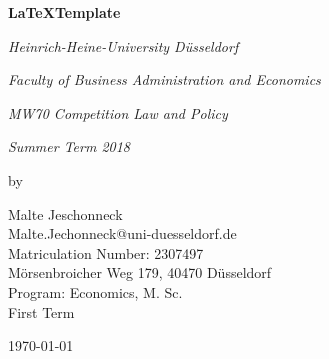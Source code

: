 \documentclass[a4paper]{scrartcl}
\begin{document}
	
	\def\sectionautorefname{section}
	\def\subsectionautorefname{section}
	\def\subsubsectionautorefname{section}
	\def\equationautorefname{equation}
	\def\algorithmautorefname{Algorithm}
	
	
	\thispagestyle{empty}
	
	\begin{titlepage}
		\centering
		\vspace{1cm}
		{\Large\bfseries \LaTeX Template \par}
		\vspace{4cm}
		{\large\itshape Heinrich-Heine-University Düsseldorf\par}
		\vspace{0.5cm}
		{\large\itshape Faculty of Business Administration and Economics\par}
		\vspace{0.5cm}
		{\large\itshape MW70 Competition Law and Policy\par}
		\vspace{0.5cm}
		{\large\itshape Summer Term 2018\par}
		{\large\itshape \par}
		\vfill
		by\par
		\vspace{0.5cm}
		Malte Jeschonneck\\
		Malte.Jechonneck@uni-duesseldorf.de\\
		Matriculation Number: 2307497\\
		Mörsenbroicher Weg 179, 40470 Düsseldorf\\
		Program: Economics, M. Sc.\\
		First Term
		
		
		\vfill
		
		{\large \today\par}
	\end{titlepage}

\restoregeometry %

\newpage
	
	\tableofcontents
	\newpage
	\listoffigures
	\newpage
	\listoftables
	\newpage
	\printglossary[title={List of Abbreviations}] %
	\newpage
	
	
	
\end{document}
